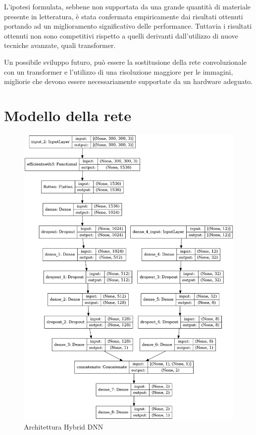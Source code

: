 L'ipotesi formulata, sebbene non supportata da una grande quantità di materiale presente in letteratura, è stata confermata empiricamente dai risultati ottenuti portando ad un miglioramento significativo delle performance. Tuttavia i risultati ottenuti non sono competitivi rispetto a quelli derivanti dall'utilizzo di nuove tecniche avanzate, quali transformer.

Un possibile sviluppo futuro, può essere la sostitusione della rete convoluzionale con un transformer e l'utilizzo di una risoluzione maggiore per le immagini, migliorie che devono essere necessariamente supportate da un hardware adeguato.




\appendix
\section{Modello della rete}
\begin{figure}[H]
    \centering
    \includegraphics[scale=0.33]{Plot/Model-Plot.png}
    \caption{Architettura Hybrid DNN}
    \label{fig:model}
\end{figure}

